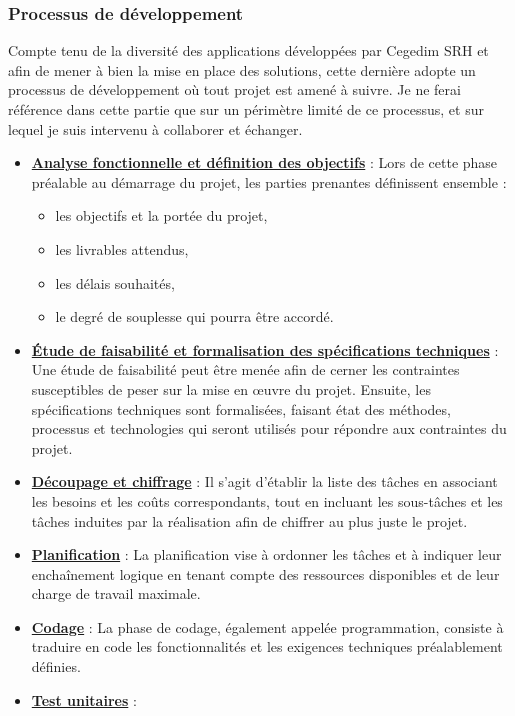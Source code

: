 \subsubsection{Processus de développement}
Compte tenu de la diversité des applications développées par Cegedim SRH et afin de mener à bien la mise en place des solutions, cette dernière adopte un processus de développement où tout projet est amené à suivre. Je ne ferai référence dans cette partie que sur un périmètre limité de ce processus, et sur lequel je suis intervenu à collaborer et échanger.
\begin{itemize}
    \item \textbf{\underline{Analyse fonctionnelle et définition des objectifs}} : Lors de cette phase préalable au démarrage du projet, les parties prenantes définissent ensemble :
    \begin{itemize}
        \item les objectifs et la portée du projet,
        \item les livrables attendus,
        \item les délais souhaités,
        \item le degré de souplesse qui pourra être accordé.
    \end{itemize}
    \item \textbf{\underline{Étude de faisabilité et formalisation des spécifications techniques}} : Une étude de faisabilité peut être menée afin de cerner les contraintes susceptibles de peser sur la mise en œuvre du projet. Ensuite, les spécifications techniques sont formalisées, faisant état des méthodes, processus et technologies qui seront utilisés pour répondre aux contraintes du projet.
    \item \textbf{\underline{Découpage et chiffrage}} : Il s'agit d'établir la liste des tâches en associant les besoins et les coûts correspondants, tout en incluant les sous-tâches et les tâches induites par la réalisation afin de chiffrer au plus juste le projet.
    \item \textbf{\underline{Planification}} : La planification vise à ordonner les tâches et à indiquer leur enchaînement logique en tenant compte des ressources disponibles et de leur charge de travail maximale.
    \item \textbf{\underline{Codage}} : La phase de codage, également appelée programmation, consiste à traduire en code les fonctionnalités et les exigences techniques préalablement définies.
    \item \textbf{\underline{Test unitaires}} : 

\end{itemize}
